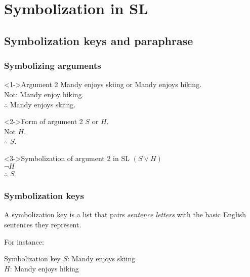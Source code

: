 ﻿%

\setcounter{section}{1}


\section{Symbolization in SL}
\subsection{Symbolization keys and paraphrase}

\begin{frame}
  \frametitle{Symbolizing arguments}

  \begin{block}<1->{Argument 2}
    Mandy enjoys skiing or Mandy enjoys hiking.\\
    Not: Mandy enjoy hiking.\\
    $\therefore$ Mandy enjoys skiing.
  \end{block}

  \begin{block}<2->{Form of argument 2}
    $S$ or $H$.\\
    Not $H$.\\
    $\therefore$ $S$.
  \end{block}

  \begin{block}<3->{Symbolization of argument 2 in SL}
    $(S \lor H)$\\
    $\lnot H$\\
    $\therefore$ $S$
  \end{block}

\end{frame}

\begin{frame}
  \frametitle{Symbolization keys}

  \begin{definition}
    A symbolization key is a list that pairs \emph{sentence letters} with
    the basic English sentences they represent.
  \end{definition}

  For instance:

  \begin{block}{Symbolization key}
    $S$: Mandy enjoys skiing\\
    $H$: Mandy enjoys hiking
  \end{block}

\end{frame}

